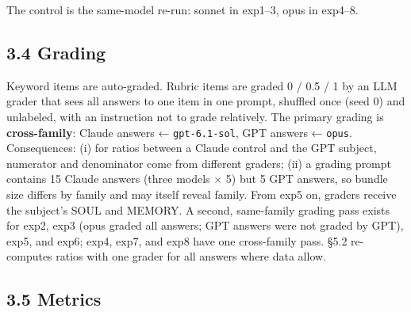 \documentclass[10pt]{article}
\begin{document}
The control is the same-model re-run: sonnet in exp1--3, opus in exp4--8.

\subsection{3.4 Grading}\label{grading}

Keyword items are auto-graded. Rubric items are graded 0 / 0.5 / 1 by an LLM grader that sees all answers to one item in one prompt, shuffled once (seed 0) and unlabeled, with an instruction not to grade relatively. The primary grading is \textbf{cross-family}: Claude answers ← \texttt{gpt-\allowbreak{}6.\allowbreak{}1-\allowbreak{}sol}, GPT answers ← \texttt{opus}. Consequences: (i) for ratios between a Claude control and the GPT subject, numerator and denominator come from different graders; (ii) a grading prompt contains 15 Claude answers (three models × 5) but 5 GPT answers, so bundle size differs by family and may itself reveal family. From exp5 on, graders receive the subject's SOUL and MEMORY. A second, same-family grading pass exists for exp2, exp3 (opus graded all answers; GPT answers were not graded by GPT), exp5, and exp6; exp4, exp7, and exp8 have one cross-family pass. §5.2 re-computes ratios with one grader for all answers where data allow.

\subsection{3.5 Metrics}\label{metrics}
\end{document}
